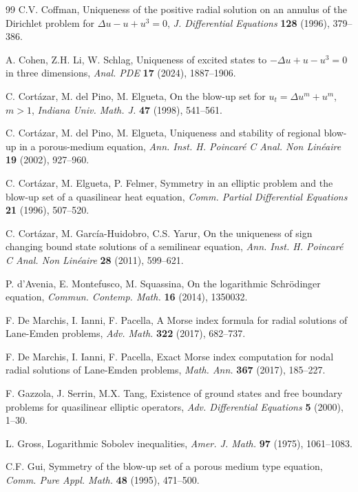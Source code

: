 \documentclass[11pt]{article}
\begin{document}
\begin{thebibliography}{99}
 C.V. Coffman,
Uniqueness of the positive radial solution on an annulus of the Dirichlet problem for
 $\Delta u-u+u^3=0$, \emph{J. Differential Equations} \textbf{128} (1996), 379--386.

A. Cohen, Z.H. Li, W. Schlag,
Uniqueness of excited states to $-\Delta u+u-u^3=0$ in three dimensions,
\emph{Anal. PDE} \textbf{17} (2024), 1887--1906.


 C. Cort\'azar, M. del Pino, M. Elgueta,
On the blow-up set for $u_t=\Delta u^m+u^m$, $m>1$,
\emph{Indiana Univ. Math. J.} \textbf{47} (1998), 541--561.

 C. Cort\'azar, M. del Pino, M. Elgueta,
Uniqueness and stability of regional blow-up in a porous-medium equation,
\emph{Ann. Inst. H. Poincar\'e C Anal. Non Lin\'eaire} \textbf{19} (2002), 927--960.

 C. Cort\'azar, M. Elgueta, P. Felmer,
Symmetry in an elliptic problem and the blow-up set of a quasilinear heat equation,
\emph{Comm. Partial Differential Equations} \textbf{21} (1996), 507--520.

C. Cort\'{a}zar, M. Garc\'{i}a-Huidobro, C.S. Yarur,
 On the uniqueness of sign changing bound state solutions of a semilinear equation,
\emph{Ann. Inst. H. Poincar\'e C Anal. Non Lin\'eaire} \textbf{28} (2011), 599--621.

 P. d'Avenia, E. Montefusco, M. Squassina,
On the logarithmic Schr\"odinger equation,
\emph{Commun. Contemp. Math.} \textbf{16} (2014), 1350032.

{F. De Marchis}, I. Ianni, F. Pacella,
A Morse index formula for radial solutions of Lane-Emden problems,
\emph{Adv. Math.} \textbf{322} (2017), 682--737.

{F. De Marchis}, I. Ianni, F. Pacella,
Exact Morse index computation for nodal radial solutions of Lane-Emden problems, \emph{Math. Ann.}
\textbf{367} (2017), 185--227.


 F. Gazzola, J. Serrin, M.X. Tang,
Existence of ground states and free boundary problems for quasilinear elliptic operators,
\emph{Adv. Differential Equations} \textbf{5} (2000), 1--30.

 L. Gross,
Logarithmic Sobolev inequalities,
\emph{Amer. J. Math.} \textbf{97} (1975), 1061--1083.

 C.F. Gui,
Symmetry of the blow-up set of a porous medium type equation,
\emph{Comm. Pure Appl. Math.} \textbf{48} (1995), 471--500.


\end{thebibliography}
\end{document}
